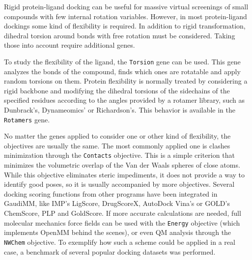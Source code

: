 Rigid protein-ligand docking can be useful for massive virtual screenings of small compounds with few internal rotation variables. However, in most protein-ligand dockings some kind of flexibility is required. In addition to rigid transformation, dihedral torsion around bonds with free rotation must be considered. Taking those into account require additional genes.

To study the flexibility of the ligand, the \texttt{Torsion} gene can be used. This gene analyzes the bonds of the compound, finds which ones are rotatable and apply random torsions on them. Protein flexibility is normally treated by considering a rigid backbone and modifying the dihedral torsions of the sidechains of the specified residues according to the angles provided by a rotamer library, such as Dunbrack's,\cite{dunbrack1993backbone} Dynameomics'\cite{scouras2011dynameomics} or Richardson's.\cite{lovell2000penultimate} This behavior is available in the \texttt{Rotamers} gene.

No matter the genes applied to consider one or other kind of flexibility, the objectives are usually the same. The most commonly applied one is clashes minimization through the \texttt{Contacts} objective. This is a simple criterion that minimizes the volumetric overlap of the Van der Waals spheres of close atoms. While this objective eliminates steric impediments, it does not provide a way to identify good poses, so it is usually accompanied by more objectives. Several docking scoring functions from other programs have been integrated in GaudiMM, like IMP's LigScore,\cite{krammer2005ligscore} DrugScoreX,\cite{neudert2011dsx} AutoDock Vina's\cite{trott2010autodock} or GOLD's ChemScore, PLP and GoldScore.\cite{verdonk2003improved} If more accurate calculations are needed, full molecular mechanics force fields can be used with the \texttt{Energy} objective (which implements OpenMM behind the scenes), or even QM analysis through the \texttt{NWChem} objective. To exemplify how such a scheme could be applied in a real case, a benchmark of several popular docking datasets was performed.